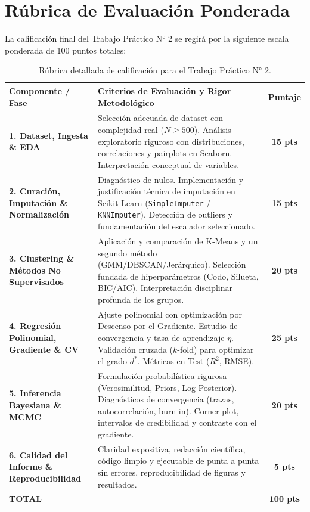 \documentclass[11pt,a4paper]{article}
\begin{document}
\section{Rúbrica de Evaluación Ponderada}
\label{sec:rubrica}

La calificación final del Trabajo Práctico N° 2 se regirá por la siguiente escala ponderada de 100 puntos totales:

\begin{table}[htbp]
\centering\small
\renewcommand{\arraystretch}{1.25}
\begin{tabularx}{\textwidth}{p{3.3cm} X c}
\toprule
\textbf{Componente / Fase} & \textbf{Criterios de Evaluación y Rigor Metodológico} & \textbf{Puntaje} \\
\midrule
\textbf{1. Dataset, Ingesta \& EDA} & 
Selección adecuada de dataset con complejidad real ($N \ge 500$). Análisis exploratorio riguroso con distribuciones, correlaciones y pairplots en Seaborn. Interpretación conceptual de variables. & \textbf{15 pts} \\
\midrule
\textbf{2. Curación, Imputación \& Normalización} & 
Diagnóstico de nulos. Implementación y justificación técnica de imputación en Scikit-Learn (\texttt{SimpleImputer} / \texttt{KNNImputer}). Detección de outliers y fundamentación del escalador seleccionado. & \textbf{15 pts} \\
\midrule
\textbf{3. Clustering \& Métodos No Supervisados} & 
Aplicación y comparación de K-Means y un segundo método (GMM/DBSCAN/Jerárquico). Selección fundada de hiperparámetros (Codo, Silueta, BIC/AIC). Interpretación disciplinar profunda de los grupos. & \textbf{20 pts} \\
\midrule
\textbf{4. Regresión Polinomial, Gradiente \& CV} & 
Ajuste polinomial con optimización por Descenso por el Gradiente. Estudio de convergencia y tasa de aprendizaje $\eta$. Validación cruzada ($k$-fold) para optimizar el grado $d^*$. Métricas en Test ($R^2$, RMSE). & \textbf{25 pts} \\
\midrule
\textbf{5. Inferencia Bayesiana \& MCMC} & 
Formulación probabilística rigurosa (Verosimilitud, Priors, Log-Posterior). Diagnósticos de convergencia (trazas, autocorrelación, burn-in). Corner plot, intervalos de credibilidad y contraste con el gradiente. & \textbf{20 pts} \\
\midrule
\textbf{6. Calidad del Informe \& Reproducibilidad} & 
Claridad expositiva, redacción científica, código limpio y ejecutable de punta a punta sin errores, reproducibilidad de figuras y resultados. & \textbf{5 pts} \\
\bottomrule
\textbf{TOTAL} & & \textbf{100 pts} \\
\bottomrule
\end{tabularx}
\caption{Rúbrica detallada de calificación para el Trabajo Práctico N° 2.}
\label{tab:rubrica}
\end{table}
\end{document}
